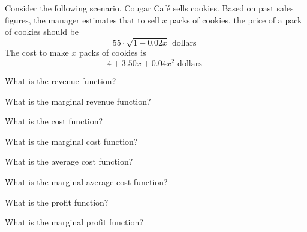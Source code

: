 
Consider the following scenario.
Cougar Caf\'e sells cookies.
Based on past sales figures, the manager estimates that to sell $x$ packs of cookies, the price of a pack of cookies should be
\begin{equation*}
 55 \cdot \sqrt{1 - 0.02 x} \text{ dollars }
\end{equation*}
The cost to make $x$ packs of cookies is
\begin{equation*}
 4 + 3.50 x + 0.04 x^2 \text{ dollars }
\end{equation*}

\begin{ProblemSet}
 \begin{Problem}
  What is the revenue function?
 \end{Problem}
 \begin{Problem}[pencil space=2in]
  What is the marginal revenue function?
 \end{Problem}
 \begin{Problem}
  What is the cost function?
 \end{Problem}
 \begin{Problem}
  What is the marginal cost function?
 \end{Problem}
 \begin{Problem}
  What is the average cost function?
 \end{Problem}
 \begin{Problem}
  What is the marginal average cost function?
 \end{Problem}
 \begin{Problem}
  What is the profit function?
 \end{Problem}
 \begin{Problem}
  What is the marginal profit function?
 \end{Problem}
\end{ProblemSet}

